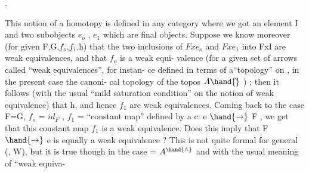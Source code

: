 .

This notion of a homotopy is defined in any category  where we got an
element I and two subobjects $e_o$ , $e_1$ which are final objects. Suppose we
 know moreover  (for given F,G,$f_o$,$f_1$,h) that the two inclusions of
$Fxe_o$ and $Fxe_1$ into FxI are weak equivalences, and that $f_o$ is a weak equi-%
valence (for a given set of arrows called ``weak equivalences'', for instan-%
ce defined in terms of a``topology'' on  , in the present case the canoni-%
cal topology of the topos $A\hand{\hat{}}$ ) ; then it follows (with the usual ``mild
saturation condition'' on the notion of weak equivalence) that h, and hence
$f_1$ are weak equivalences. Coming back to the case F=G, $f_o$ = $id_F$ , $f_1$ =
``constant map'' defined by a c: e $\hand{\to}$ F , we get that this constant map
$f_1$ is a weak equivalence. Does this imply that F $\hand{\to}$ e is equally a weak
equivalence ? This is not quite formal for general (, W), but it is 
true though in the case  = $A^{\hand{\wedge}}$ and with the usual meaning of ``weak equiva-%
